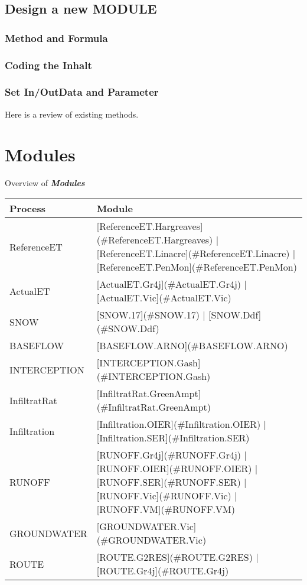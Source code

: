 \documentclass[
]{book}
\begin{document}
\hypertarget{design-a-new-module}{%
\section{Design a new MODULE}\label{design-a-new-module}}

\hypertarget{method-and-formula}{%
\subsection{Method and Formula}\label{method-and-formula}}

\hypertarget{coding-the-inhalt}{%
\subsection{Coding the Inhalt}\label{coding-the-inhalt}}

\hypertarget{set-inoutdata-and-parameter}{%
\subsection{Set In/OutData and Parameter}\label{set-inoutdata-and-parameter}}

Here is a review of existing methods.

\hypertarget{module}{%
\chapter{Modules}\label{module}}

Overview of \textbf{\emph{Modules}}

\begin{table}[!h]
\centering
\begin{tabular}{l|l}
\hline
Process & Module\\
\hline
ReferenceET & [ReferenceET.Hargreaves](\#ReferenceET.Hargreaves) | [ReferenceET.Linacre](\#ReferenceET.Linacre) | [ReferenceET.PenMon](\#ReferenceET.PenMon)\\
\cline{1-2}
ActualET & [ActualET.Gr4j](\#ActualET.Gr4j) | [ActualET.Vic](\#ActualET.Vic)\\
\cline{1-2}
SNOW & [SNOW.17](\#SNOW.17) | [SNOW.Ddf](\#SNOW.Ddf)\\
\cline{1-2}
BASEFLOW & [BASEFLOW.ARNO](\#BASEFLOW.ARNO)\\
\cline{1-2}
INTERCEPTION & [INTERCEPTION.Gash](\#INTERCEPTION.Gash)\\
\cline{1-2}
InfiltratRat & [InfiltratRat.GreenAmpt](\#InfiltratRat.GreenAmpt)\\
\cline{1-2}
Infiltration & [Infiltration.OIER](\#Infiltration.OIER) | [Infiltration.SER](\#Infiltration.SER)\\
\cline{1-2}
RUNOFF & [RUNOFF.Gr4j](\#RUNOFF.Gr4j) | [RUNOFF.OIER](\#RUNOFF.OIER) | [RUNOFF.SER](\#RUNOFF.SER) | [RUNOFF.Vic](\#RUNOFF.Vic) | [RUNOFF.VM](\#RUNOFF.VM)\\
\cline{1-2}
GROUNDWATER & [GROUNDWATER.Vic](\#GROUNDWATER.Vic)\\
\cline{1-2}
ROUTE & [ROUTE.G2RES](\#ROUTE.G2RES) | [ROUTE.Gr4j](\#ROUTE.Gr4j)\\
\hline
\end{tabular}
\end{table}
\end{document}
